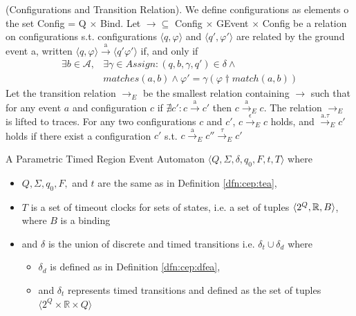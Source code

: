 			\begin{dfn}
				(Configurations and Transition Relation).
				We define configurations as elements o the set Config = Q $\times$ Bind. Let $\rightarrow \subseteq$ Config $\times$ GEvent $\times$ Config be a relation on
				configurations s.t. configurations $\langle q, \varphi \rangle$ and $\langle q', \varphi' \rangle$ are related by the ground event a, written
				$\langle q, \varphi \rangle \xrightarrow{\text{a}} \langle q' \varphi' \rangle$ if, and only if
					\begin{align}
						\exists b \in \mathcal{A}, & \exists \gamma \in Assign : (q, b, \gamma, q') \in \delta \wedge \\
						&matches(a,b) \wedge \varphi' = \gamma(\varphi \dagger match(a,b))
					\end{align}
				Let the transition relation $\rightarrow_{E}$ be the smallest relation containing $\rightarrow$ such that for any event
				$a$ and configuration $c$ if $\nexists c' : c \xrightarrow{\text{a}} c'$ then $ c \xrightarrow{\text{a}}_E c$.
				The relation $\rightarrow_E$ is lifted to traces.
				For any two configurations $c$ and $c'$, $ c \xrightarrow{\text{$\epsilon$}}_E c$ holds, and $\xrightarrow{\text{a.$\tau$}}_E c'$ holds
				if there exist a configuration $c'$ s.t. $c \xrightarrow{\text{a}}_E c'' \xrightarrow{\text{$\tau$}}_E c'$
			\end{dfn}
			
			
			\begin{dfn}
				\label{dfn:cep:PTREA}
				A Parametric Timed Region Event Automaton $\langle Q,\Sigma,\delta,q_0, F, t, T \rangle$ where
				\begin{itemize}
					\item $Q, \Sigma, q_0, F,$ and  $t$ are the same as in Definition \ref{dfn:cep:tea},
					\item $T$ is a set of timeout clocks for sets of states, i.e. a set of tuples $\langle 2^Q, \mathbb{R}, B \rangle$, where $B$ is a binding
					\item and $\delta$ is the union of discrete and timed transitions i.e. $\delta_t \cup \delta_d$ where
					\begin{itemize}
						\item $\delta_d$ is defined as in Definition \ref{dfn:cep:dfea},
						\item and $\delta_t$ represents timed transitions and defined as the set of tuples $\langle 2^Q \times \mathbb{R} \times Q \rangle$ 
					\end{itemize}
				\end{itemize}
			\end{dfn}

